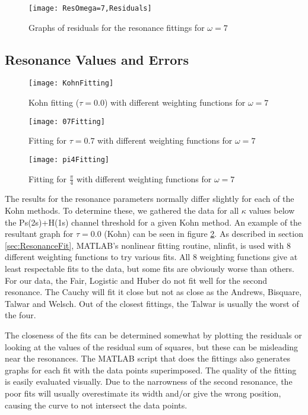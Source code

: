 \documentclass[Dissertation.tex]{subfiles}
\begin{document}
\begin{figure}[H]
	\centering
	\texttt{[image: ResOmega=7,Residuals]}
	\caption{Graphs of residuals for the resonance fittings for $\omega = 7$}
	\label{fig:ResOmega=7,Residuals}
\end{figure}


\subsection{Resonance Values and Errors}
\label{sec:ResonanceErrors}

\begin{figure}[H]
	\centering
	\texttt{[image: KohnFitting]}
	\caption{Kohn fitting ($\tau = 0.0$) with different weighting functions for $\omega = 7$}
	\label{fig:KohnFitting}
\end{figure}

\begin{figure}[H]
	\centering
	\texttt{[image: 07Fitting]}
	\caption{Fitting for $\tau = 0.7$ with different weighting functions for $\omega = 7$}
	\label{fig:07Fitting}
\end{figure}

\begin{figure}[H]
	\centering
	\texttt{[image: pi4Fitting]}
	\caption{Fitting for $\frac{\pi}{4}$ with different weighting functions for $\omega = 7$}
	\label{fig:pi4Fitting}
\end{figure}

The results for the resonance parameters normally differ slightly for each of the Kohn methods.  To determine these, we gathered the data for all $\kappa$ values below the Ps(2s)+H(1s) channel threshold for a given Kohn method.  An example of the resultant graph for $\tau = 0.0$ (Kohn) can be seen in figure \ref{fig:KohnFitting}.  As described in section \ref{sec:ResonanceFit}, MATLAB's nonlinear fitting routine, nlinfit, is used with 8 different weighting functions to try various fits.  All 8 weighting functions give at least respectable fits to the data, but some fits are obviously worse than others.  For our data, the Fair, Logistic and Huber do not fit well for the second resonance.  The Cauchy will fit it close but not as close as the Andrews, Bisquare, Talwar and Welsch.  Out of the closest fittings, the Talwar is usually the worst of the four.

The closeness of the fits can be determined somewhat by plotting the residuals or looking at the values of the residual sum of squares, but these can be misleading near the resonances.  The MATLAB script that does the fittings also generates graphs for each fit with the data points superimposed.  The quality of the fitting is easily evaluated visually.  Due to the narrowness of the second resonance, the poor fits will usually overestimate its width and/or give the wrong position, causing the curve to not intersect the data points.
\end{document}
